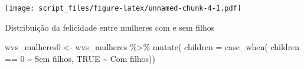 \documentclass[
]{article}
\newenvironment{Shaded}{\begin{snugshade}}{\end{snugshade}}
\newcommand{\AttributeTok}[1]{\textcolor[rgb]{0.77,0.63,0.00}{#1}}
\newcommand{\ConstantTok}[1]{\textcolor[rgb]{0.00,0.00,0.00}{#1}}
\newcommand{\DecValTok}[1]{\textcolor[rgb]{0.00,0.00,0.81}{#1}}
\newcommand{\FunctionTok}[1]{\textcolor[rgb]{0.00,0.00,0.00}{#1}}
\newcommand{\NormalTok}[1]{#1}
\newcommand{\OtherTok}[1]{\textcolor[rgb]{0.56,0.35,0.01}{#1}}
\newcommand{\SpecialCharTok}[1]{\textcolor[rgb]{0.00,0.00,0.00}{#1}}
\newcommand{\StringTok}[1]{\textcolor[rgb]{0.31,0.60,0.02}{#1}}
\begin{document}
\texttt{[image: script\_files/figure-latex/unnamed-chunk-4-1.pdf]}

Distribuição da felicidade entre mulheres com e sem filhos

\begin{Shaded}
\begin{Highlighting}[]
\NormalTok{wvs\_mulheres0 }\OtherTok{\textless{}{-}}\NormalTok{ wvs\_mulheres }\SpecialCharTok{\%\textgreater{}\%} 
  \FunctionTok{mutate}\NormalTok{(}
    \AttributeTok{children =} \FunctionTok{case\_when}\NormalTok{(}
\NormalTok{      children }\SpecialCharTok{==} \DecValTok{0} \SpecialCharTok{\textasciitilde{}} \StringTok{\textquotesingle{}Sem filhos\textquotesingle{}}\NormalTok{,}
      \ConstantTok{TRUE} \SpecialCharTok{\textasciitilde{}} \StringTok{\textquotesingle{}Com filhos\textquotesingle{}}\NormalTok{))}


\end{Highlighting}
\end{Shaded}
\end{document}

